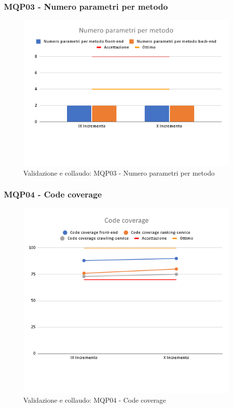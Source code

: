 \subsubsection{MQP03 - Numero parametri per metodo}
\begin{figure}[H]
    \centering
    \includegraphics[scale=0.50]{Sezioni/images/last_prodotto/Numero_parametri_per_metodo.png}
    \caption{Validazione e collaudo: MQP03 - Numero parametri per metodo}
\end{figure}
\subsubsection{MQP04 - Code coverage}
\begin{figure}[H]
    \centering
    \includegraphics[scale=0.50]{Sezioni/images/last_prodotto/Code_coverage.png}
    \caption{Validazione e collaudo: MQP04 - Code coverage}
\end{figure}
